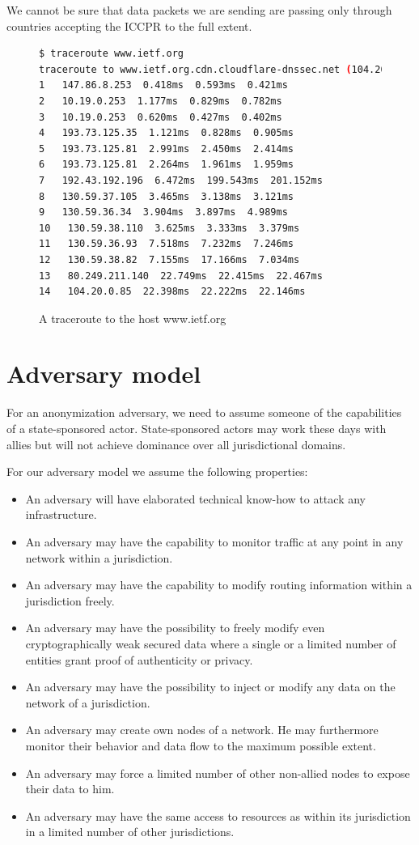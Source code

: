 We cannot be sure that data packets we are sending are passing only through countries accepting the ICCPR to the full extent.

\begin{figure}[H]
	\begin{lstlisting}[language=bash,breaklines=true,basicstyle=\tiny]
$ traceroute www.ietf.org
traceroute to www.ietf.org.cdn.cloudflare-dnssec.net (104.20.0.85), 64 hops max
1   147.86.8.253  0.418ms  0.593ms  0.421ms
2   10.19.0.253  1.177ms  0.829ms  0.782ms
3   10.19.0.253  0.620ms  0.427ms  0.402ms
4   193.73.125.35  1.121ms  0.828ms  0.905ms
5   193.73.125.81  2.991ms  2.450ms  2.414ms
6   193.73.125.81  2.264ms  1.961ms  1.959ms
7   192.43.192.196  6.472ms  199.543ms  201.152ms
8   130.59.37.105  3.465ms  3.138ms  3.121ms
9   130.59.36.34  3.904ms  3.897ms  4.989ms
10   130.59.38.110  3.625ms  3.333ms  3.379ms
11   130.59.36.93  7.518ms  7.232ms  7.246ms
12   130.59.38.82  7.155ms  17.166ms  7.034ms
13   80.249.211.140  22.749ms  22.415ms  22.467ms
14   104.20.0.85  22.398ms  22.222ms  22.146ms
	\end{lstlisting}
	\caption{A traceroute to the host www.ietf.org}
\end{figure}

\section{Adversary model\label{sec:adversary}}
For an anonymization adversary, we need to assume someone of the capabilities of a state-sponsored actor. State-sponsored actors may work these days with allies but will not achieve dominance over all jurisdictional domains.

For our adversary model we assume the following properties:
\begin{itemize}
	\item An adversary will have elaborated technical know-how to attack any infrastructure.
	\item An adversary may have the capability to monitor traffic at any point in any network within a jurisdiction.
	\item An adversary may have the capability to modify routing information within a jurisdiction freely.
	\item An adversary may have the possibility to freely modify even cryptographically weak secured data where a single or a limited number of entities grant proof of authenticity or privacy.
	\item An adversary may have the possibility to inject or modify any data on the network of a jurisdiction.
	\item An adversary may create own nodes of a network. He may furthermore monitor their behavior and data flow to the maximum possible extent.
	\item An adversary may force a limited number of other non-allied nodes to expose their data to him.
	\item An adversary may have the same access to resources as within its jurisdiction in a limited number of other jurisdictions.
\end{itemize}

